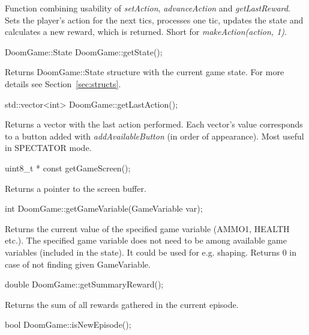 \documentclass[english,bachelor,a4paper,twoside]{ppfcmthesis}
\begin{document}
	Function combining usability of \emph{setAction}, \emph{advanceAction} and \emph{getLastReward}. Sets the player's action for the next tics, processes one tic, updates the state and calculates a new reward, which is returned. Short for \emph{makeAction(action, 1)}.


\vspace{20pt}
\begin{clinee}
	DoomGame::State DoomGame::getState();
\end{clinee}

	Returns DoomGame::State structure with the current game state. For more details see Section~\ref{sec:structs}.


\vspace{20pt}
\begin{clinee}
	std::vector<int> DoomGame::getLastAction();
\end{clinee}

	Returns a vector with the last action performed. Each vector's value corresponds to a button added with \emph{addAvailableButton} (in order of appearance). Most useful in SPECTATOR mode.


\vspace{20pt}
\begin{clinee}
	uint8_t * const getGameScreen();
\end{clinee}

	Returns a pointer to the screen buffer.


\vspace{20pt}
\begin{clinee}
	int DoomGame::getGameVariable(GameVariable var);
\end{clinee}

	Returns the current value of the specified game variable (AMMO1, HEALTH etc.). The specified game variable does not need to be among available game variables (included in the state).
	It could be used for e.g. shaping. Returns 0 in case of not finding given GameVariable.


\vspace{20pt}
\begin{clinee}
	double DoomGame::getSummaryReward();
\end{clinee}

	Returns the sum of all rewards gathered in the current episode.


\vspace{20pt}
\begin{clinee}
	bool DoomGame::isNewEpisode();
\end{clinee}
\end{document}
